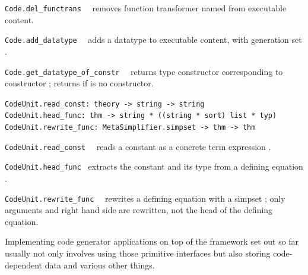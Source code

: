 \begin{isabellebody}
\begin{isamarkuptext}
\begin{description}
  \item \verb|Code.del_functrans|~~ removes
     function transformer named  from executable content.

  \item \verb|Code.add_datatype|~~ adds
     a datatype to executable content, with generation
     set .

  \item \verb|Code.get_datatype_of_constr|~~
     returns type constructor corresponding to
     constructor ; returns 
     if  is no constructor.

  \end{description}%
\end{isamarkuptext}%
\isamarkuptrue%
%
\endisatagmlref
{\isafoldmlref}%
%
\isadelimmlref
%
\endisadelimmlref
%
\isamarkuptrue%
%
\isadelimmlref
%
\endisadelimmlref
%
\isatagmlref
%
\begin{isamarkuptext}%
\begin{mldecls}
  \verb|CodeUnit.read_const: theory -> string -> string| \\
  \verb|CodeUnit.head_func: thm -> string * ((string * sort) list * typ)| \\
  \verb|CodeUnit.rewrite_func: MetaSimplifier.simpset -> thm -> thm| \\
  \end{mldecls}

  \begin{description}

  \item \verb|CodeUnit.read_const|~~
     reads a constant as a concrete term expression .

  \item \verb|CodeUnit.head_func|~
     extracts the constant and its type from a defining equation .

  \item \verb|CodeUnit.rewrite_func|~~
     rewrites a defining equation  with a simpset ;
     only arguments and right hand side are rewritten,
     not the head of the defining equation.

  \end{description}%
\end{isamarkuptext}%
\isamarkuptrue%
%
\endisatagmlref
{\isafoldmlref}%
%
\isadelimmlref
%
\endisadelimmlref
%
\isamarkuptrue%
%
\begin{isamarkuptext}%
Implementing code generator applications on top
  of the framework set out so far usually not only
  involves using those primitive interfaces
  but also storing code-dependent data and various
  other things.


\end{isamarkuptext}
\end{isabellebody}
